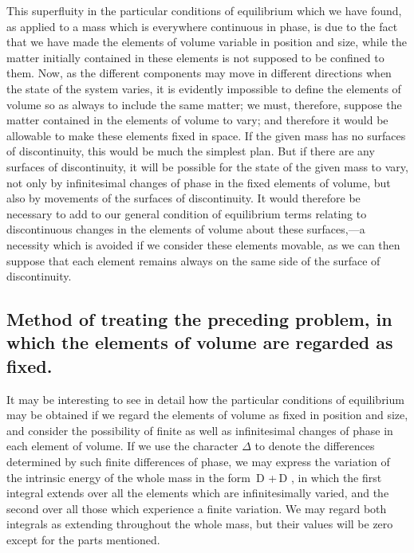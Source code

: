 \documentclass[12pt]{article}
\begin{document}
This superfluity in the particular conditions of equilibrium which we have found, as applied to a mass which is everywhere continuous in phase, is due to the fact that we have made the elements of volume variable in position and size, while the matter initially contained in these elements is not supposed to be confined to them. Now, as the different components may move in different directions when the state of the system varies, it is evidently impossible to define the elements of volume so as always to include the same matter; we must, therefore, suppose the matter contained in the elements of volume to vary; and therefore it would be allowable to make these elements fixed in space. If the given mass has no surfaces of discontinuity, this would be much the simplest plan. But if there are any surfaces of discontinuity, it will be possible for the state of the given mass to vary, not only by infinitesimal changes of phase in the fixed elements of volume, but also by movements of the surfaces of discontinuity.  It would therefore be necessary to add to our general condition of equilibrium terms relating to discontinuous changes in the elements of volume about these surfaces,---a necessity which is avoided if we consider these elements movable, as we can then suppose that each element remains always on the same side of the surface of discontinuity.

\subsection{Method of treating the preceding problem, in which the elements of
volume are regarded as fixed.}

It may be interesting to see in detail how the particular conditions of equilibrium may be obtained if we regard the elements of volume as fixed in position and size, and consider the possibility of finite as well as infinitesimal changes of phase in each element of volume. If we use the character $\Delta$ to denote the differences determined by such finite differences of phase, we may express the variation of the intrinsic energy of the whole mass in the form
\eqs \int \delta \,D \epsilon +\int \Delta \,D \epsilon,  \label{237}\eqe
in which the first integral extends over all the elements which are infinitesimally varied, and the second over all those which experience a finite variation. We may regard both integrals as extending throughout the whole mass, but their values will be zero except for the parts mentioned.
\end{document}
